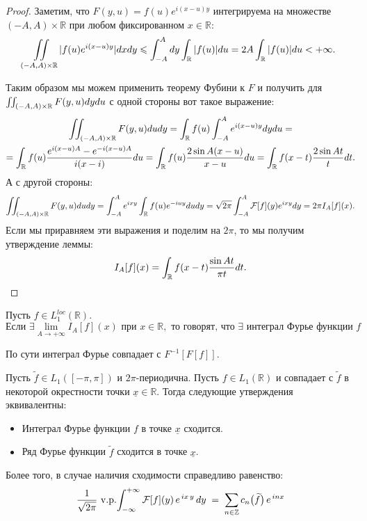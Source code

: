 \begin{proof}

Заметим, что $F(y, u) = f(u)e^{i(x-u)y}$ интегрируема на множестве $(-A, A) \times \mathbb{R}$ при любом фиксированном $x \in \mathbb{R}$:
\[
    \iint\limits_{(-A, A) \times \mathbb{R}} |f(u)e^{i(x - u)y}|dxdy \leqslant \int_{-A}^{A}dy \int_{\mathbb{R}}|f(u)|du = 2A \int_{\mathbb{R}} |f(u)|du < +\infty.
\]


Таким образом мы можем применить теорему Фубини к $F$ и получить для $\iint_{(-A, A) \times \mathbb{R}} F(y, u)dydu$ с одной стороны вот такое выражение:
\begin{multline*}
    \iint_{(-A, A) \times \mathbb{R}} F(y, u) du dy = \int_{\mathbb{R}} f(u) \int_{-A}^{A} e^{i(x - u)y}dy du = \\ =
    \int_{\mathbb{R}} f(u) \dfrac{e^{i(x - u)A} - e^{-i(x - u)A}}{i(x - i)}du = \int_{\mathbb{R}} f(u) \dfrac{2 \sin A(x - u)}{x - u}du = \int_{\mathbb{R}} f(x - t) \dfrac{2 \sin At}{t}dt.
\end{multline*}
А с другой стороны:
\begin{equation*}
    \iint_{(-A, A) \times \mathbb{R}} F(y, u) du dy = \int_{-A}^{A} e^{ixy} \int_{\mathbb{R}} f(u) e^{-iuy}du dy = \sqrt {2\pi} \int_{-A}^{A} \mathcal{F}[f](y) e^{ixy} dy = 2\pi I_A[f](x).
\end{equation*}
Если мы приравняем эти выражения и поделим на $2\pi$, то мы получим утверждение леммы:
\[
    I_{A}[f](x) = \int_{\mathbb{R}} f(x - t) \dfrac{\sin At}{\pi t}dt.
\]
\end{proof}

\begin{definition}
    Пусть $f \in L_1^{loc}(\mathbb{R})$.
\[
\text{Если } \exists \lim_{A \to +\infty} I_A[f](x) \text{ при } x \in \mathbb{R}, \text{ то говорят, что $\exists$ интеграл Фурье функции } f 
\]

\begin{center}
    По сути интеграл Фурье совпадает с $F^{-1}[F[f]].$
\end{center}
\end{definition}

\begin{theorem}
    Пусть \( \widetilde{f} \in L_1([-\pi, \pi]) \) и \(2\pi\)-периодична.
    Пусть \( f \in L_1(\mathbb{R}) \) и совпадает с \( \widetilde{f} \) в некоторой окрестности точки \( \underline{x} \in \mathbb{R} \).
    Тогда следующие утверждения эквивалентны:
    \begin{itemize}
        \item Интеграл Фурье функции $f$ в точке \(\underline{x}\) сходится.
        \item Ряд Фурье функции \(\widetilde{f}\) сходится в точке \(\underline{x}\).
    \end{itemize}
    Более того, в случае наличия сходимости справедливо равенство:
\[
\frac{1}{\sqrt{2\pi}}\,\mathop{\mathrm{v.p.}}\!\int
_{-\infty}^{+\infty}
\mathcal{F}[f](y)\,e^{\,i x\,y}\,dy
\;=\;
\sum_{n\in\mathbb{Z}}
c_{n}\bigl(\widetilde{f}\bigr)\,e^{\,i n x}
\]
\end{theorem}

